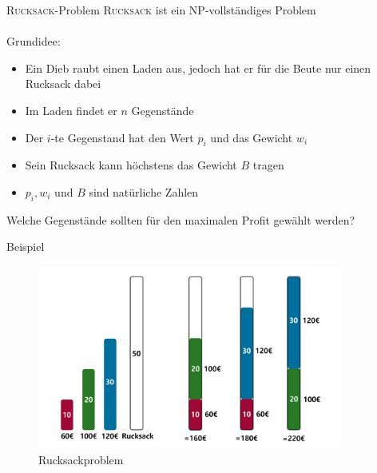\begin{frame}{\textsc{Rucksack}-Problem}
    \textsc{Rucksack} ist ein NP-vollständiges Problem \\~\\
    \pause
    Grundidee: 
    
    \begin{itemize}
        \item Ein Dieb raubt einen Laden aus, jedoch hat er für die Beute nur einen Rucksack dabei
        \item Im Laden findet er $n$ Gegenstände
        \item Der $i$-te Gegenstand hat den Wert $p_i$ und das Gewicht $w_i$
        \item Sein Rucksack kann höchstens das Gewicht $B$ tragen
        \item $p_i, w_i$ und $B$ sind natürliche Zahlen
    \end{itemize}
    \alert{Welche Gegenstände sollten für den maximalen Profit gewählt werden?} 
\end{frame}
\begin{frame}{Beispiel}
    \begin{figure}[ht]
    	\centering
    	\includegraphics[width=0.9\textwidth]{img/Rucksack.pdf}
    	\caption{Rucksackproblem}
    	\label{fig:rucksack}
    \end{figure}
\end{frame}
